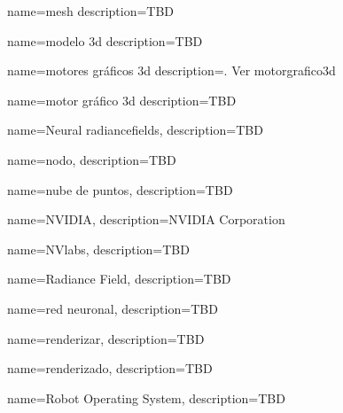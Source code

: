 



{
    name={mesh}
    description={TBD}
}

{
    name={modelo \acrshort{3d}}
    description={TBD}
}

{
    name={motores gráficos \acrshort{3d}}
    description={. Ver \gls{motorgrafico3d}}
}

{
    name={motor gráfico \acrshort{3d}}
    description={TBD}
}


{
    name={Neural \glspl{radiancefield}},
    description={TBD}
}

{
    name={nodo},
    description={TBD}
}

{
    name={nube de puntos},
    description={TBD}
}

{
    name={NVIDIA},
    description={NVIDIA Corporation}
}

{
    name={NVlabs},
    description={TBD}
}





{
    name={Radiance Field},
    description={TBD}
}

{
    name={red neuronal},
    description={TBD}
}

{
    name={renderizar},
    description={TBD}
}

{
    name={renderizado},
    description={TBD}
}

{
    name={Robot Operating System},
    description={TBD}
}

